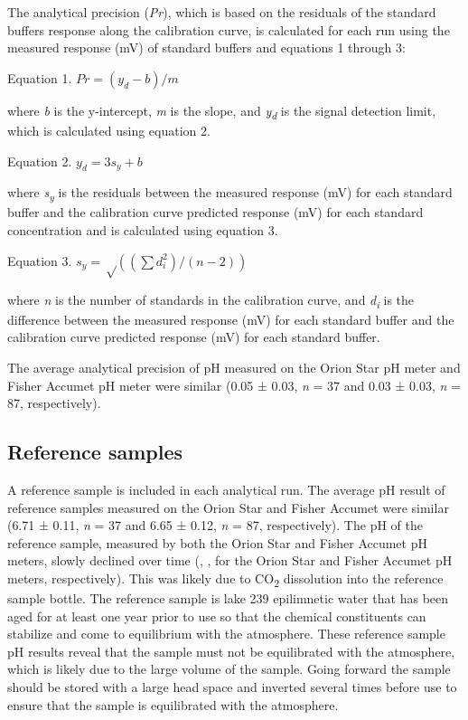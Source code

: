 \documentclass[
]{article}
\begin{document}
The analytical precision (\emph{Pr}), which is based on the residuals of
the standard buffers response along the calibration curve, is calculated
for each run using the measured response (mV) of standard buffers and
equations 1 through 3:

Equation 1. \(Pr = (y_d-b)/m\)

where \emph{b} is the y-intercept, \emph{m} is the slope, and
\emph{y\textsubscript{d}} is the signal detection limit, which is
calculated using equation 2.

Equation 2. \(y_d = 3s_y+b\)

where \emph{s\textsubscript{y}} is the residuals between the measured
response (mV) for each standard buffer and the calibration curve
predicted response (mV) for each standard concentration and is
calculated using equation 3.

Equation 3. \(s_y = √((∑d_i^2 )/(n-2))\)

where \emph{n} is the number of standards in the calibration curve, and
\emph{d\textsubscript{i}} is the difference between the measured
response (mV) for each standard buffer and the calibration curve
predicted response (mV) for each standard buffer.

The average analytical precision of pH measured on the Orion Star pH
meter and Fisher Accumet pH meter were similar (0.05 ± 0.03, \emph{n} =
37 and 0.03 ± 0.03, \emph{n} = 87, respectively).

\pagebreak

\hypertarget{reference-samples}{%
\subsection{Reference samples}\label{reference-samples}}

A reference sample is included in each analytical run. The average pH
result of reference samples measured on the Orion Star and Fisher
Accumet were similar (6.71 ± 0.11, \emph{n} = 37 and 6.65 ± 0.12,
\emph{n} = 87, respectively). The pH of the reference sample, measured
by both the Orion Star and Fisher Accumet pH meters, slowly declined
over time (, , for the Orion Star and Fisher Accumet pH meters,
respectively). This was likely due to CO\textsubscript{2} dissolution
into the reference sample bottle. The reference sample is lake 239
epilimnetic water that has been aged for at least one year prior to use
so that the chemical constituents can stabilize and come to equilibrium
with the atmosphere. These reference sample pH results reveal that the
sample must not be equilibrated with the atmosphere, which is likely due
to the large volume of the sample. Going forward the sample should be
stored with a large head space and inverted several times before use to
ensure that the sample is equilibrated with the atmosphere.
\end{document}
